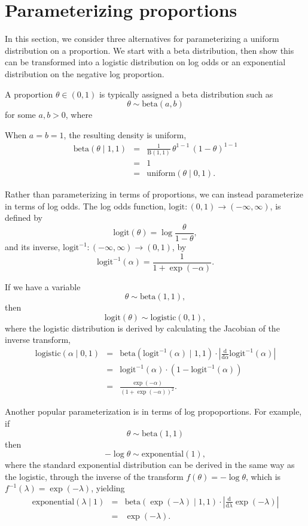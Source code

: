 \documentclass[11pt]{report}
\newcommand{\logit}{\textrm{logit}}
\newcommand{\ilogit}{\logit^{-1}}
\begin{document}
\section{Parameterizing proportions}

In this section, we consider three alternatives for parameterizing a
uniform distribution on a proportion. We start with a beta
distribution, then show this can be transformed into a logistic
distribution on log odds or an exponential distribution on the
negative log proportion.

A proportion $\theta \in (0, 1)$ is typically assigned a beta
distribution such as
\[
  \theta \sim \textrm{beta}(a, b)
\]
for some $a, b > 0$, where


When $a = b = 1$, the resulting density is uniform,
\begin{eqnarray*}
  \textrm{beta}(\theta \mid 1, 1)
  & = & \frac{1}{\textrm{B}(1, 1)}
        \, \theta^{1 - 1}
        \, (1 - \theta)^{1 - 1}
  \\[2pt]
  & = & 1
  \\
  & = & \textrm{uniform}(\theta \mid 0, 1).
\end{eqnarray*}

Rather than parameterizing in terms of proportions, we can instead
parameterize in terms of log odds.  The log odds function, $\logit:(0,
1) \rightarrow (-\infty, \infty)$, is defined by
%
\[
  \logit(\theta) = \log \frac{\theta}{1 - \theta},
\]
and its inverse, $\ilogit:(-\infty, \infty) \rightarrow (0, 1)$, by
\[
  \ilogit(\alpha) = \frac{1}{1 + \exp(-\alpha)}.
\]

If we have a variable
\[
  \theta \sim \textrm{beta}(1, 1),
\]
then
\[
  \logit(\theta) \sim \textrm{logistic}(0, 1),
\]
%
where the logistic distribution is derived by calculating the Jacobian
of the inverse transform,
%
\begin{eqnarray*}
  \textrm{logistic}(\alpha \mid 0, 1)
  & = & \textrm{beta}(\ilogit(\alpha) \mid 1, 1)
        \cdot
        \left|
        \frac{\textrm{d}}{\textrm{d}\alpha} \ilogit(\alpha)
        \right|
  \\[4pt]
  & = & \ilogit(\alpha) \cdot (1 - \ilogit(\alpha))
  \\[2pt]
  & = & \frac{\exp(-\alpha)}{(1 + \exp(-\alpha))^2}.
\end{eqnarray*}

Another popular parameterization is in terms of log propoportions.
For example, if
\[
  \theta \sim \textrm{beta}(1, 1)
\]
then
\[
  -\log \theta \sim \textrm{exponential}(1),
\]
where the standard exponential distribution can be derived in the same
way as the logistic, through the inverse of the transform $f(\theta) =
-\log \theta$, which is $f^{-1}(\lambda) = \exp(-\lambda)$, yielding
%
\begin{eqnarray*}
  \textrm{exponential}(\lambda \mid 1)
  & = & \textrm{beta}(\exp(-\lambda) \mid 1, 1)
        \cdot
        \left|
        \frac{\textrm{d}}{\textrm{d}\lambda} \exp(-\lambda)
        \right|
  \\[4pt]
  & = &
        \exp(-\lambda).
\end{eqnarray*}
\end{document}
